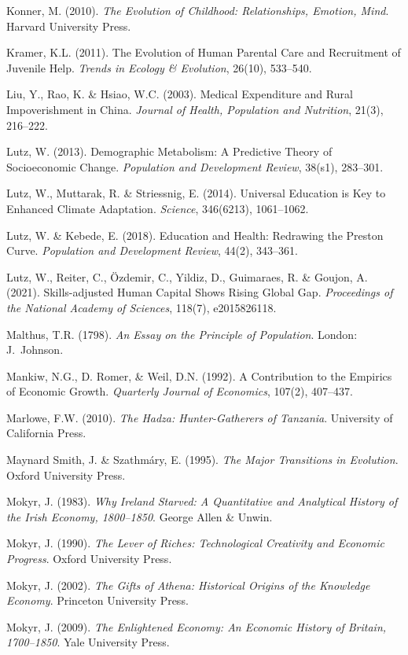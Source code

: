 Konner, M. (2010). \emph{The Evolution of Childhood: Relationships,
Emotion, Mind}. Harvard University Press.

Kramer, K.L. (2011). The Evolution of Human Parental Care and
Recruitment of Juvenile Help. \emph{Trends in Ecology \& Evolution},
26(10), 533--540.

Liu, Y., Rao, K. \& Hsiao, W.C. (2003). Medical Expenditure and Rural
Impoverishment in China. \emph{Journal of Health, Population and
Nutrition}, 21(3), 216--222.

Lutz, W. (2013). Demographic Metabolism: A Predictive Theory of
Socioeconomic Change. \emph{Population and Development Review},
38(s1), 283--301.

Lutz, W., Muttarak, R. \& Striessnig, E. (2014). Universal Education
is Key to Enhanced Climate Adaptation. \emph{Science}, 346(6213),
1061--1062.

Lutz, W. \& Kebede, E. (2018). Education and Health: Redrawing the
Preston Curve. \emph{Population and Development Review}, 44(2),
343--361.

Lutz, W., Reiter, C., Özdemir, C., Yildiz, D., Guimaraes, R. \& Goujon,
A. (2021). Skills-adjusted Human Capital Shows Rising Global Gap.
\emph{Proceedings of the National Academy of Sciences}, 118(7),
e2015826118.

Malthus, T.R. (1798). \emph{An Essay on the Principle of Population}.
London: J.~Johnson.

Mankiw, N.G., D. Romer, \& Weil, D.N. (1992). A Contribution to the
Empirics of Economic Growth. \emph{Quarterly Journal of Economics},
107(2), 407--437.

Marlowe, F.W. (2010). \emph{The Hadza: Hunter-Gatherers of Tanzania}.
University of California Press.

Maynard Smith, J. \& Szathmáry, E. (1995). \emph{The Major Transitions
in Evolution}. Oxford University Press.

Mokyr, J. (1983). \emph{Why Ireland Starved: A Quantitative and
Analytical History of the Irish Economy, 1800--1850}. George Allen
\& Unwin.

Mokyr, J. (1990). \emph{The Lever of Riches: Technological Creativity
and Economic Progress}. Oxford University Press.

Mokyr, J. (2002). \emph{The Gifts of Athena: Historical Origins of the
Knowledge Economy}. Princeton University Press.

Mokyr, J. (2009). \emph{The Enlightened Economy: An Economic History
of Britain, 1700--1850}. Yale University Press.

